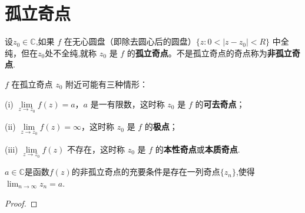 \documentclass[../../main.tex]{subfiles}%
\begin{document}
\section{孤立奇点}

\begin{definition}
设$z_0\in \mathbb{C}$,如果 \( f \) 在无心圆盘（即除去圆心后的圆盘）\( \{ z: 0 < |z - z_0| < R \} \) 中全纯，但在$z_0$处不全纯,就称 \( z_0 \) 是 \( f \) 的\textbf{孤立奇点}。不是孤立奇点的奇点称为\textbf{非孤立奇点}.

\( f \) 在孤立奇点 \( z_0 \) 附近可能有三种情形：

(i) \( \lim\limits_{z \to z_0} f(z) = a \)，\( a \) 是一有限数，这时称 \( z_0 \) 是 \( f \) 的\textbf{可去奇点}；

(ii) \( \lim\limits_{z \to z_0} f(z) = \infty \)，这时称 \( z_0 \) 是 \( f \) 的\textbf{极点}；

(iii) \( \lim\limits_{z \to z_0} f(z) \) 不存在，这时称 \( z_0 \) 是 \( f \) 的\textbf{本性奇点}或\textbf{本质奇点}.
\end{definition}

\begin{theorem}
$a\in \mathbb{C}$是函数$f(z)$的非孤立奇点的充要条件是存在一列奇点$\{z_n\}$,使得$\lim_{n\to \infty}z_n=a.$
\end{theorem}
\begin{proof}



\end{proof}
\end{document}
